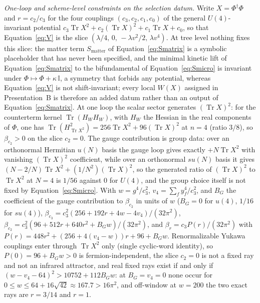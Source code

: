 \emph{One-loop and scheme-level constraints on the selection datum.} Write \(X=\Phi^\dagger\Phi\) and \(r=c_2/c_3\) for the four couplings \((c_3,c_2,c_1,c_0)\) of the general \(U(4)\)-invariant potential \(c_3\operatorname{Tr}X^2+c_2(\operatorname{Tr}X)^2+c_1\operatorname{Tr}X+c_0\), so that Equation~\eqref{eq:V} is the slice \((\lambda/4,\,0,\,-\lambda v^2/2,\,\lambda v^4)\).
At tree level nothing fixes this slice: the matter term \(S_{\mathrm{matter}}\) of Equation~\eqref{eq:Smatrix} is a symbolic placeholder that has never been specified, and the minimal kinetic lift of Equation~\eqref{eq:Smatrix} to the bifundamental of Equation~\eqref{eq:Smicro} is invariant under \(\Phi\mapsto\Phi+\kappa\,\mathbb I\), a symmetry that forbids any potential, whereas Equation~\eqref{eq:V} is not shift-invariant; every local \(W(X)\) assigned in Presentation~B is therefore an added datum rather than an output of Equation~\eqref{eq:Smatrix}.
At one loop the scalar sector generates \((\operatorname{Tr}X)^2\): for the counterterm kernel \(\operatorname{Tr}(H_WH_W)\), with \(H_W\) the Hessian in the real components of \(\Phi\), one has \(\operatorname{Tr}(H_{\operatorname{Tr}X^2}^2)=256\operatorname{Tr}X^2+96(\operatorname{Tr}X)^2\) at \(n=4\) (ratio \(3/8\)), so \(\beta_{c_2}>0\) on the slice \(c_2=0\).
The gauge contribution is group data: over an orthonormal Hermitian \(u(N)\) basis the gauge loop gives exactly \(+N\operatorname{Tr}X^2\) with vanishing \((\operatorname{Tr}X)^2\) coefficient, while over an orthonormal \(su(N)\) basis it gives \((N-2/N)\operatorname{Tr}X^2+(1/N^2)(\operatorname{Tr}X)^2\), so the generated ratio of \((\operatorname{Tr}X)^2\) to \(\operatorname{Tr}X^2\) at \(N=4\) is \(1/56\) against \(0\) for \(U(4)\), and the group choice itself is not fixed by Equation~\eqref{eq:Smicro}.
With \(w=g^4/c_3^2\), \(v_4=\sum_f y_f^4/c_3^2\), and \(B_G\) the coefficient of the gauge contribution to \(\beta_{c_2}\) in units of \(w\) (\(B_G=0\) for \(u(4)\), \(1/16\) for \(su(4)\)), \(\beta_{c_3}=c_3^2(256+192r+4w-4v_4)/(32\pi^2)\), \(\beta_{c_2}=c_3^2(96+512r+640r^2+B_Gw)/(32\pi^2)\), and \(\beta_r=c_3P(r)/(32\pi^2)\) with \(P(r)=448r^2+(256+4(v_4-w))r+96+B_Gw\).
Renormalizable Yukawa couplings enter through \(\operatorname{Tr}X^2\) only (single cyclic-word identity), so \(P(0)=96+B_Gw>0\) is fermion-independent, the slice \(c_2=0\) is not a fixed ray and not an infrared attractor, and real fixed rays exist if and only if \((w-v_4-64)^2>10752+112B_Gw\): at \(B_G=v_4=0\) none occur for \(0\le w\le 64+16\sqrt{42}\approx167.7>16\pi^2\), and off-window at \(w=200\) the two exact rays are \(r=3/14\) and \(r=1\).

